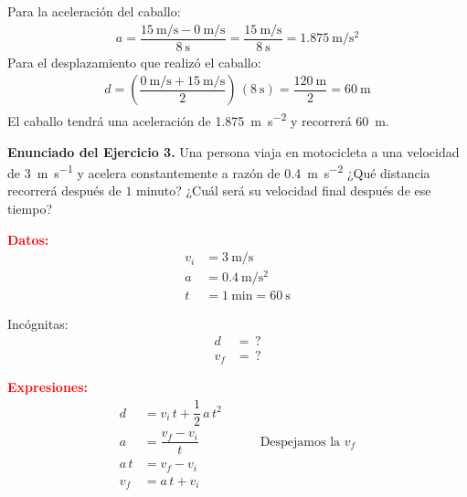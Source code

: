 \documentclass[14pt]{extarticle}
\newcommand{\textocolor}[2]{\textbf{\textcolor{#1}{#2}}}
\begin{document}
\vspace*{0.5cm}
Para la aceleración del caballo:
\begin{align*}
a = \dfrac{\displaystyle \SI[per-mode=fraction]{15}{\meter\per\second} - \SI[per-mode=fraction]{0}{\meter\per\second}}{\SI{8}{\second}} = \dfrac{\displaystyle \SI[per-mode=fraction]{15}{\meter\per\second}}{\SI{8}{\second}} = \SI[per-mode=fraction]{1.875}{\meter\per\square\second}
\end{align*}
Para el desplazamiento que realizó el caballo:
\begin{align*}
d = \left( \dfrac{\displaystyle \SI[per-mode=fraction]{0}{\meter\per\second} + \SI[per-mode=fraction]{15}{\meter\per\second}}{2} \right) \, (\SI{8}{\second})= \dfrac{ \SI{120}{\meter}}{2} = \SI{60}{\meter}
\end{align*}
El caballo tendrá una aceleración de \SI{1.875}{\meter\per\square\second} y recorrerá \SI{60}{\meter}.

\vspace*{0.5cm}
\noindent
\textbf{Enunciado del Ejercicio 3. } Una persona viaja en motocicleta a una velocidad de \SI{3}{\meter\per\second} y acelera constantemente a razón de \SI{0.4}{\meter\per\square\second} ¿Qué distancia recorrerá después de $1$ minuto? ¿Cuál será su velocidad final después de ese tiempo?

\begin{minipage}[t]{0.3\linewidth}
\textocolor{red}{Datos:}
\begin{align*}
v_{i} &= \SI{3}{\meter\per\second} \\
a &= \SI{0.4}{\meter\per\square\second} \\
t &= \SI{1}{\minute} = \SI{60}{\second}
\end{align*}
\end{minipage}
\hspace{0.1cm}
\begin{minipage}[t]{0.3\linewidth}
\hspace{1.5cm} Incógnitas:
\begin{align*}
d &= \, ? \\
v_{f} &= \, ?
\end{align*}
\end{minipage}

\vspace*{0.3cm}
\textocolor{red}{Expresiones:}
\begin{align*}
d &= v_{i} \, t + \dfrac{1}{2} \, a \, t^{2} \\[0.5em]
a &= \dfrac{v_{f} - v_{i}}{t} \hspace{2cm} \text{Despejamos la } v_{f} \\
a \, t &= v_{f} - v_{i} \\
v_{f} &= a \, t + v_{i}
\end{align*}
\end{document}

